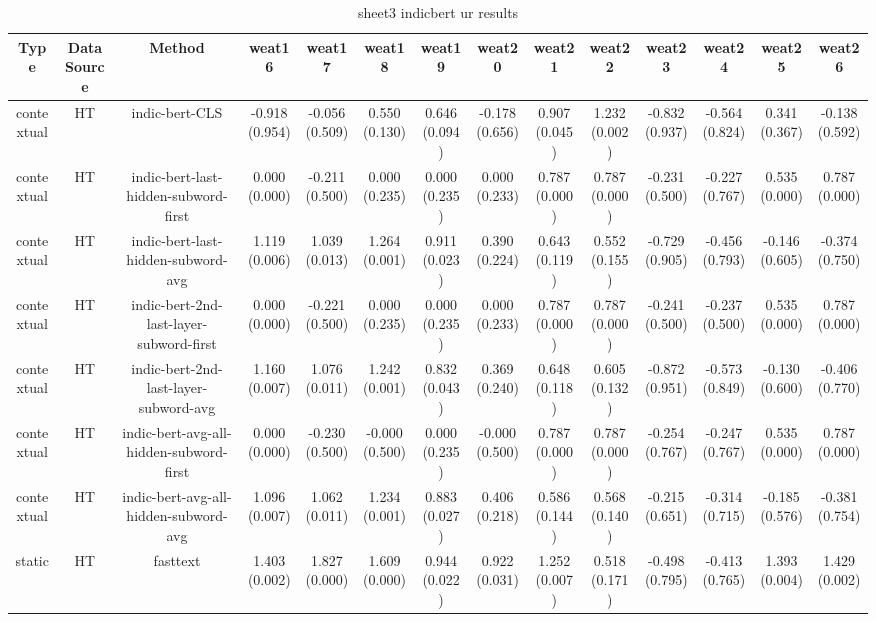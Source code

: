 \begin{sidewaystable}[htb]
    \centering
    \caption{sheet3 indicbert ur results}
    \label{appendix_tab:sheet3_indicbert_ur_results}
    \small
    \begin{tabular}{@{}cccccccccccccc@{}}
        \toprule
        Type & DataSource & Method & weat16 & weat17 & weat18 & weat19 & weat20 & weat21 & weat22 & weat23 & weat24 & weat25 & weat26 \\
        \midrule
        contextual & HT & indic-bert-CLS & -0.918 (0.954) & -0.056 (0.509) & 0.550 (0.130) & 0.646 (0.094) & -0.178 (0.656) & 0.907 (0.045) & 1.232 (0.002) & -0.832 (0.937) & -0.564 (0.824) & 0.341 (0.367) & -0.138 (0.592) \\
        contextual & HT & indic-bert-last-hidden-subword-first & 0.000 (0.000) & -0.211 (0.500) & 0.000 (0.235) & 0.000 (0.235) & 0.000 (0.233) & 0.787 (0.000) & 0.787 (0.000) & -0.231 (0.500) & -0.227 (0.767) & 0.535 (0.000) & 0.787 (0.000) \\
        contextual & HT & indic-bert-last-hidden-subword-avg & 1.119 (0.006) & 1.039 (0.013) & 1.264 (0.001) & 0.911 (0.023) & 0.390 (0.224) & 0.643 (0.119) & 0.552 (0.155) & -0.729 (0.905) & -0.456 (0.793) & -0.146 (0.605) & -0.374 (0.750) \\
        contextual & HT & indic-bert-2nd-last-layer-subword-first & 0.000 (0.000) & -0.221 (0.500) & 0.000 (0.235) & 0.000 (0.235) & 0.000 (0.233) & 0.787 (0.000) & 0.787 (0.000) & -0.241 (0.500) & -0.237 (0.500) & 0.535 (0.000) & 0.787 (0.000) \\
        contextual & HT & indic-bert-2nd-last-layer-subword-avg & 1.160 (0.007) & 1.076 (0.011) & 1.242 (0.001) & 0.832 (0.043) & 0.369 (0.240) & 0.648 (0.118) & 0.605 (0.132) & -0.872 (0.951) & -0.573 (0.849) & -0.130 (0.600) & -0.406 (0.770) \\
        contextual & HT & indic-bert-avg-all-hidden-subword-first & 0.000 (0.000) & -0.230 (0.500) & -0.000 (0.500) & 0.000 (0.235) & -0.000 (0.500) & 0.787 (0.000) & 0.787 (0.000) & -0.254 (0.767) & -0.247 (0.767) & 0.535 (0.000) & 0.787 (0.000) \\
        contextual & HT & indic-bert-avg-all-hidden-subword-avg & 1.096 (0.007) & 1.062 (0.011) & 1.234 (0.001) & 0.883 (0.027) & 0.406 (0.218) & 0.586 (0.144) & 0.568 (0.140) & -0.215 (0.651) & -0.314 (0.715) & -0.185 (0.576) & -0.381 (0.754) \\
        static & HT & fasttext & 1.403 (0.002) & 1.827 (0.000) & 1.609 (0.000) & 0.944 (0.022) & 0.922 (0.031) & 1.252 (0.007) & 0.518 (0.171) & -0.498 (0.795) & -0.413 (0.765) & 1.393 (0.004) & 1.429 (0.002) \\

\end{tabular}
\end{sidewaystable}
